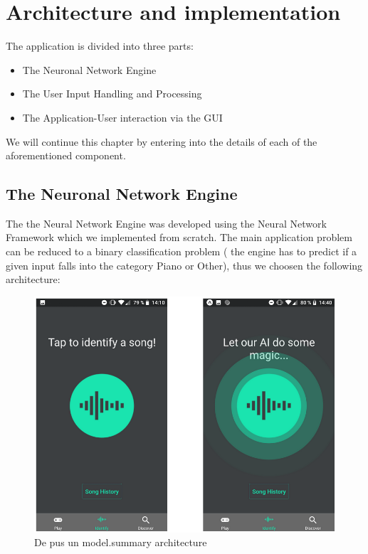 \chapter{Architecture and implementation}

The application is divided into three parts:
	\begin{itemize}
		\addtolength{\itemindent}{1cm}
		\item The Neuronal Network Engine
		\item The User Input Handling and Processing
		\item The Application-User interaction via the GUI
	\end{itemize}

We will continue this chapter by entering into the details of each of the aforementioned component.

\section{The Neuronal Network Engine}

The the Neural Network Engine was developed using the Neural Network Framework which we implemented from scratch.
The main application problem can be reduced to a binary classification problem ( the engine has to predict if a given
input falls into the category Piano or Other), thus we choosen the following architecture:


\begin{figure}[H]
	\centering
	\includegraphics{images/spektrum.png}
	\caption{De pus un model.summary architecture}
\label{model_arch}
\end{figure}

